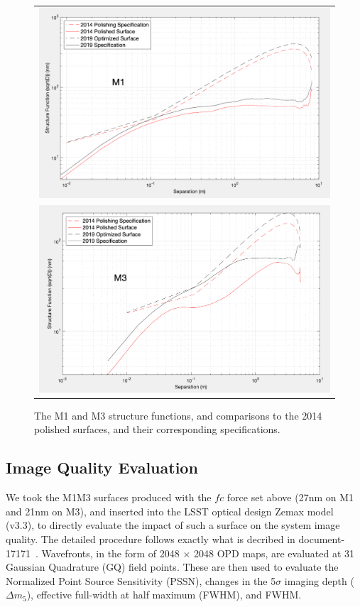 \documentclass [twoside,openbib,12pt]{article}
\begin{document}
 
 \begin{figure}[bthp]
   \begin{center}
     \begin{tabular}{c}
\includegraphics[width=140mm]{figures/M1SF.png}\\
\includegraphics[width=140mm]{figures/M3SF.png}
  \end{tabular}
   \end{center}
   \caption
   { \label{fig:SF}
     The M1 and M3 structure functions, and comparisons to the 2014
     polished surfaces, and their corresponding specifications.
 }
\end{figure}
 
 \subsection{Image Quality Evaluation}

 We took the M1M3
 surfaces produced with the $fc$ force set above (27nm on M1 and
 21nm on M3), and inserted into the LSST optical design Zemax
 model (v3.3), to directly evaluate the impact of such a surface on
 the system image quality.
 The detailed procedure follows exactly what is decribed in
 document-17171~\cite{m1m3perf}.
 Wavefronts, in the form of 2048 $\times$ 2048 OPD maps, are evaluated
 at 31 Gaussian Quadrature (GQ) field points.
 These are then used to evaluate the Normalized Point Source
 Sensitivity (PSSN), changes in the 5$\sigma$ imaging depth ($\Delta
 m_5$), effective full-width at half maximum (FWHM), and FWHM.
\end{document}

